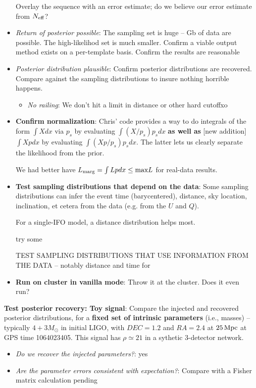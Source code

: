 \documentclass[twocolumn,prd,nofootinbib]{revtex4}
\newcommand\editremark[1]{{\color{red} #1}}
\newcommand\unit[1]{\, {\rm #1}}
\begin{document}
\begin{widetext}
\begin{itemize}
Overlay the sequence with an error estimate; do we believe our error estimate from $N_{\rm eff}$?

\item \emph{Return of posterior possible}: The sampling set is huge -- Gb of data are possible.   The high-likelihod set
  is much smaller.   Confirm a viable output method exists on a per-template basis.  Confirm the results are reasonable

\item \emph{Posterior distribution plausible}: Confirm posterior distributions are recovered.  Compare against the
  sampling distributions to insure nothing horrible happens. 
\begin{itemize}
\item \emph{No railing}: We don't hit a limit in distance or other hard cutoffxo
\end{itemize}

\item \textbf{Confirm normalization}: Chris' code provides a way to do integrals of the form $\int X dx$ via $p_s$ by
  evaluating $\int (X/p_s)  p_s dx$ \textbf{as well as} [new addition] $\int X p dx$ by evaluating $\int (X p/p_s)p_s
  dx$.  The latter lets us clearly separate the likelihood from the prior.

We had better have $L_{\rm marg} = \int L p dx \le \text{max} L$ for real-data results.


\item  \textbf{Test sampling distributions that depend on the data}: Some sampling distributions can infer the event
  time (barycentered), distance, sky location, inclination, et cetera from the data (e.g. from the $U$ and $Q$).  

For a single-IFO model, a distance distribution helps most.

\editremark{try some}

\editremark{TEST SAMPLING DISTRIBUTIONS THAT USE INFORMATION FROM THE DATA} -- notably distance and time for 

\item \textbf{Run on cluster in vanilla mode}: Throw it at the cluster.  Does it even run?
\end{itemize}


\noindent \textbf{Test posterior recovery: Toy signal}: Compare the injected and recovered posterior distributions, for a
\textbf{fixed set of intrinsic parameters} (i.e., masses) -- typically $4+3 M_\odot$ in initial LIGO, with $DEC=1.2$ and
$RA=2.4$ at $25\unit{Mpc}$ at GPS time 1064023405.  This signal has $\rho \simeq 21$ in a sythetic 3-detector network.
\begin{itemize}
\item \emph{Do we recover the injected parameters?}: \editremark{yes}
\item \emph{Are the parameter errors consistent with expectation?}: Compare with a Fisher matrix calculation \editremark{pending}
\end{itemize}


\end{widetext}
\end{document}
